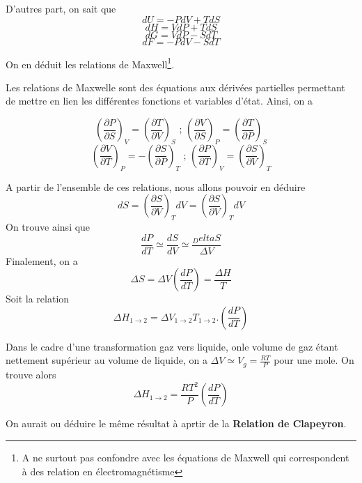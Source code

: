 D'autres part, on sait que 
$$dU = -PdV + TdS$$
$$dH = VdP+TdS$$
$$dG=VdP-SdT$$
$$dF=-PdV-SdT$$

On en déduit les relations de Maxwell\footnote{A ne surtout pas confondre avec les équations de Maxwell qui correspondent à des relation en électromagnétisme}.

\begin{theorem}
Les relations de Maxwelle sont des équations aux dérivées partielles permettant de mettre en lien les différentes fonctions et variables d'état. Ainsi, on a

\begin{equation}
 \left ( \frac{\partial P}{\partial S}\right ) _V =  \left ( \frac{\partial T}{\partial V}\right ) _S \textrm{   ;   } \left ( \frac{\partial V}{\partial S}\right ) _P =  \left ( \frac{\partial T}{\partial P}\right ) _S
 \end{equation}
  \begin{equation}
 \left ( \frac{\partial V}{\partial T}\right ) _P = - \left ( \frac{\partial S}{\partial P}\right ) _T \textrm{   ;   } \left ( \frac{\partial P}{\partial T}\right ) _V =  \left ( \frac{\partial S}{\partial V}\right ) _T
 \end{equation}
 
 \end{theorem}
 
 A partir de l'ensemble de ces relations, nous allons pouvoir en déduire
 $$dS=\left ( \frac{\partial S}{\partial V}\right ) _TdV=\left ( \frac{\partial S}{\partial V}\right ) _TdV$$
 On trouve ainsi que
 $$\frac{dP}{dT}\simeq\frac{dS}{dV} \simeq \frac{_Delta S}{\Delta V}$$
 Finalement, on a
 $$\Delta S = \Delta V  \left ( \frac{d P}{d T}\right ) = \frac{\Delta H}{T}$$
 Soit la relation
 \begin{equation}
 \Delta H_{1\rightarrow2} = \Delta V_{1\rightarrow2} T_{1\rightarrow2} .\left ( \frac{d P}{d T}\right ) 
 \end{equation}
 
 Dans le cadre d'une transformation gaz vers liquide, onle volume de gaz étant nettement supérieur au volume de liquide, on a $\Delta V \simeq V_g =\frac{RT}{P}$ pour une mole. On trouve alors
 \begin{equation}
 \Delta H_{1\rightarrow2} = \frac{RT^2}{P} \left ( \frac{dP}{dT} \right )
 \end{equation}
 
On aurait ou déduire le même résultat à aprtir de la \textbf {Relation de Clapeyron}.
 
